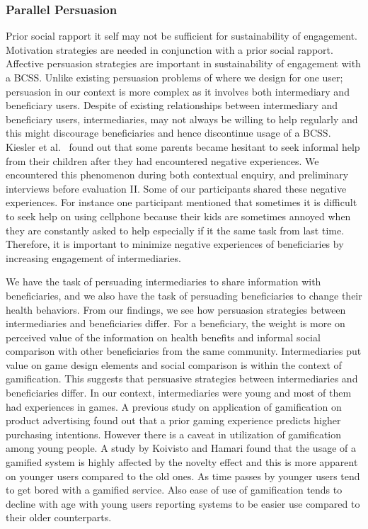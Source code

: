 \documentclass{sig-alternate}
\begin{document}
\subsubsection*{\textbf{Parallel Persuasion}} 
Prior social rapport it self may not be sufficient for sustainability of engagement. Motivation strategies are needed in conjunction with a prior social rapport. Affective persuasion strategies are important in sustainability of engagement with a BCSS.  Unlike existing persuasion problems of where we design for one user; persuasion in our context is more complex as it involves both intermediary and beneficiary users. Despite of existing relationships between intermediary and
beneficiary users, intermediaries, may not always be willing to help regularly
and this might discourage beneficiaries and hence discontinue usage of a BCSS.
Kiesler et al.~\cite{kiesler:twi} found out that some parents became hesitant
to seek informal help from their children after they had encountered negative
experiences. We encountered this phenomenon during both contextual enquiry,
and preliminary interviews before evaluation II. Some of our participants
shared these negative experiences. For instance one participant mentioned that
sometimes it is difficult to seek help on using cellphone because their kids
are sometimes annoyed when they are constantly asked to help especially if it
the same task from last time. Therefore, it is important to minimize negative
experiences of beneficiaries by increasing engagement of intermediaries.

We have the task of persuading intermediaries to share information with
beneficiaries, and we also have the task of persuading beneficiaries to change
their health behaviors. From our findings, we see how persuasion strategies
between intermediaries and beneficiaries differ. For a beneficiary, the weight is more on perceived value of the information on health benefits and informal social comparison with other beneficiaries from the same community. Intermediaries put value on
game design elements and social comparison is within the context of
gamification. This suggests that persuasive strategies between intermediaries and beneficiaries differ. In our context, intermediaries were young and most of them had experiences in games. A previous study on application of gamification on product advertising\cite{v2014motivational} found out that a prior gaming experience predicts higher purchasing intentions. However there is a caveat in utilization of gamification among young people. A study by Koivisto and Hamari\cite{koivisto2014demographic} found that the usage of  a gamified system is highly affected by the novelty effect and this is more apparent on younger users compared to the old ones. As time passes by younger users tend to get bored with a gamified service. Also ease of use of gamification tends to decline with age \cite{koivisto2014demographic} with young users reporting systems to be easier use compared to their older counterparts.  
\end{document}
